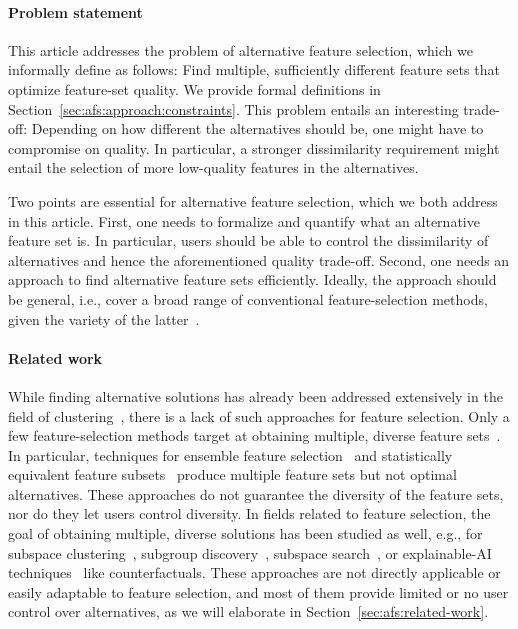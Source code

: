 \documentclass{article}
\theoremstyle{definition}
\begin{document}
\paragraph{Problem statement}

This article addresses the problem of alternative feature selection, which we informally define as follows:
Find multiple, sufficiently different feature sets that optimize feature-set quality.
We provide formal definitions in Section~\ref{sec:afs:approach:constraints}.
This problem entails an interesting trade-off:
Depending on how different the alternatives should be, one might have to compromise on quality.
In particular, a stronger dissimilarity requirement might entail the selection of more low-quality features in the alternatives.

Two points are essential for alternative feature selection, which we both address in this article.
First, one needs to formalize and quantify what an alternative feature set is.
In particular, users should be able to control the dissimilarity of alternatives and hence the aforementioned quality trade-off.
Second, one needs an approach to find alternative feature sets efficiently.
Ideally, the approach should be general, i.e., cover a broad range of conventional feature-selection methods, given the variety of the latter~\cite{chandrashekar2014survey, li2017feature}.

\paragraph{Related work}

While finding alternative solutions has already been addressed extensively in the field of clustering~\cite{bailey2014alternative}, there is a lack of such approaches for feature selection.
Only a few feature-selection methods target at obtaining multiple, diverse feature sets~\cite{borboudakis2021extending}.
In particular, techniques for ensemble feature selection~\cite{saeys2008robust, seijo2017ensemble} and statistically equivalent feature subsets~\cite{lagani2017feature} produce multiple feature sets but not optimal alternatives.
These approaches do not guarantee the diversity of the feature sets, nor do they let users control diversity.
In fields related to feature selection, the goal of obtaining multiple, diverse solutions has been studied as well, e.g., for subspace clustering~\cite{hu2018subspace, mueller2009relevant}, subgroup discovery~\cite{leeuwen2012diverse}, subspace search~\cite{trittenbach2019dimension}, or explainable-AI techniques~\cite{artelt2022even, kim2016examples, mothilal2020explaining, russell2019efficient} like counterfactuals.
These approaches are not directly applicable or easily adaptable to feature selection, and most of them provide limited or no user control over alternatives, as we will elaborate in Section~\ref{sec:afs:related-work}.
\end{document}
